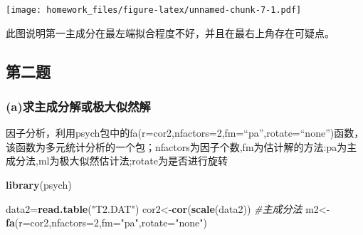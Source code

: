 \documentclass[
]{article}
\newenvironment{Shaded}{\begin{snugshade}}{\end{snugshade}}
\newcommand{\CommentTok}[1]{\textcolor[rgb]{0.56,0.35,0.01}{\textit{#1}}}
\newcommand{\DataTypeTok}[1]{\textcolor[rgb]{0.13,0.29,0.53}{#1}}
\newcommand{\DecValTok}[1]{\textcolor[rgb]{0.00,0.00,0.81}{#1}}
\newcommand{\KeywordTok}[1]{\textcolor[rgb]{0.13,0.29,0.53}{\textbf{#1}}}
\newcommand{\NormalTok}[1]{#1}
\newcommand{\OperatorTok}[1]{\textcolor[rgb]{0.81,0.36,0.00}{\textbf{#1}}}
\newcommand{\StringTok}[1]{\textcolor[rgb]{0.31,0.60,0.02}{#1}}
\begin{document}
\begin{Shaded}
\end{Shaded}

\texttt{[image: homework\_files/figure-latex/unnamed-chunk-7-1.pdf]}

此图说明第一主成分在最左端拟合程度不好，并且在最右上角存在可疑点。

\hypertarget{ux7b2cux4e8cux9898}{%
\subsection{第二题}\label{ux7b2cux4e8cux9898}}

\hypertarget{aux6c42ux4e3bux6210ux5206ux89e3ux6216ux6781ux5927ux4f3cux7136ux89e3}{%
\subsubsection{(a)求主成分解或极大似然解}\label{aux6c42ux4e3bux6210ux5206ux89e3ux6216ux6781ux5927ux4f3cux7136ux89e3}}

因子分析，利用psych包中的fa(r=cor2,nfactors=2,fm=``pa'',rotate=``none'')函数，该函数为多元统计分析的一个包；nfactors为因子个数,fm为估计解的方法:pa为主成分法,ml为极大似然估计法;rotate为是否进行旋转

\begin{Shaded}
\begin{Highlighting}[]
\KeywordTok{library}\NormalTok{(psych)}
\end{Highlighting}
\end{Shaded}

\begin{Shaded}
\begin{Highlighting}[]
\NormalTok{data2=}\KeywordTok{read.table}\NormalTok{(}\StringTok{"T2.DAT"}\NormalTok{)}
\NormalTok{cor2<-}\KeywordTok{cor}\NormalTok{(}\KeywordTok{scale}\NormalTok{(data2)) }
\CommentTok{#主成分法}
\NormalTok{m2<-}\KeywordTok{fa}\NormalTok{(}\DataTypeTok{r=}\NormalTok{cor2,}\DataTypeTok{nfactors=}\DecValTok{2}\NormalTok{,}\DataTypeTok{fm=}\StringTok{"pa"}\NormalTok{,}\DataTypeTok{rotate=}\StringTok{"none"}\NormalTok{)}
\end{Highlighting}
\end{Shaded}
\end{document}
